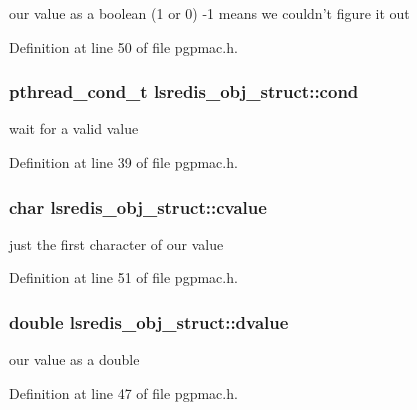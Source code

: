 our value as a boolean (1 or 0) -\/1 means we couldn't figure it out 



Definition at line 50 of file pgpmac.\-h.

\hypertarget{structlsredis__obj__struct_a356f6a228bb19ac7d66fdb1c875d68be}{
\subsubsection[{cond}]{\setlength{\rightskip}{0pt plus 5cm}pthread\-\_\-cond\-\_\-t lsredis\-\_\-obj\-\_\-struct\-::cond}}\label{structlsredis__obj__struct_a356f6a228bb19ac7d66fdb1c875d68be}


wait for a valid value 



Definition at line 39 of file pgpmac.\-h.

\hypertarget{structlsredis__obj__struct_a4a5933dbd44d33d9f594f6020a443b69}{
\subsubsection[{cvalue}]{\setlength{\rightskip}{0pt plus 5cm}char lsredis\-\_\-obj\-\_\-struct\-::cvalue}}\label{structlsredis__obj__struct_a4a5933dbd44d33d9f594f6020a443b69}


just the first character of our value 



Definition at line 51 of file pgpmac.\-h.

\hypertarget{structlsredis__obj__struct_ab60d0a71cabad6b921b6edb5a8f68996}{
\subsubsection[{dvalue}]{\setlength{\rightskip}{0pt plus 5cm}double lsredis\-\_\-obj\-\_\-struct\-::dvalue}}\label{structlsredis__obj__struct_ab60d0a71cabad6b921b6edb5a8f68996}


our value as a double 



Definition at line 47 of file pgpmac.\-h.

